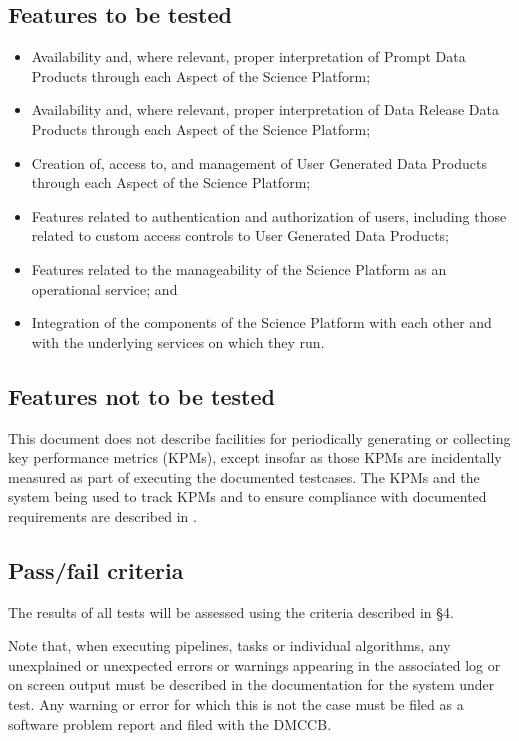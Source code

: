 \documentclass[DM,lsstdraft,STS,toc]{lsstdoc}
\begin{document}
\subsection{Features to be tested}
\label{sec:feat2test}

\begin{itemize}

\item{Availability and, where relevant, proper interpretation of Prompt Data Products through each Aspect of the Science Platform;}
\item{Availability and, where relevant, proper interpretation of Data Release Data Products through each Aspect of the Science Platform;}
\item{Creation of, access to, and management of User Generated Data Products through each Aspect of the Science Platform;}
\item{Features related to authentication and authorization of users, including those related to custom access controls to User Generated Data Products;}
\item{Features related to the manageability of the Science Platform as an operational service; and}
\item{Integration of the components of the Science Platform with each other and with the underlying services on which they run.}

\end{itemize}

\subsection{Features not to be tested}
\label{sec:featnot2test}

This document does not describe facilities for periodically generating or collecting key performance metrics (KPMs), except insofar as those KPMs are incidentally measured as part of executing the documented testcases. 
The KPMs and the system being used to track KPMs and to ensure compliance with documented requirements are described in .

\subsection{Pass/fail criteria}
\label{sec:passfail}

The results of all tests will be assessed using the criteria described in  \S4.

Note that, when executing pipelines, tasks or individual algorithms, any unexplained or unexpected errors or warnings appearing in the associated log or on screen output must be described in the documentation for the system under test. 
Any warning or error for which this is not the case must be filed as a software problem report and filed with the DMCCB.
\end{document}
